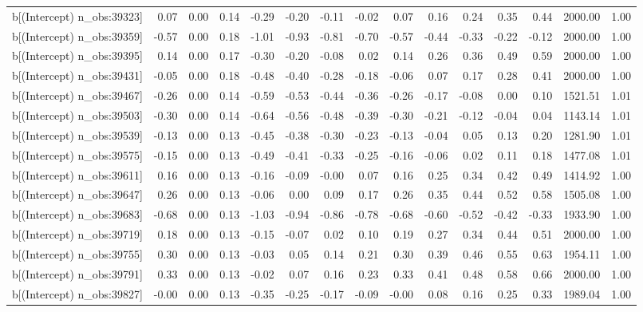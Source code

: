\begin{table}[ht]
\begin{tabular}{rrrrrrrrrrrrrrr}
  b[(Intercept) n\_obs:39323] & 0.07 & 0.00 & 0.14 & -0.29 & -0.20 & -0.11 & -0.02 & 0.07 & 0.16 & 0.24 & 0.35 & 0.44 & 2000.00 & 1.00 \\ 
  b[(Intercept) n\_obs:39359] & -0.57 & 0.00 & 0.18 & -1.01 & -0.93 & -0.81 & -0.70 & -0.57 & -0.44 & -0.33 & -0.22 & -0.12 & 2000.00 & 1.00 \\ 
  b[(Intercept) n\_obs:39395] & 0.14 & 0.00 & 0.17 & -0.30 & -0.20 & -0.08 & 0.02 & 0.14 & 0.26 & 0.36 & 0.49 & 0.59 & 2000.00 & 1.00 \\ 
  b[(Intercept) n\_obs:39431] & -0.05 & 0.00 & 0.18 & -0.48 & -0.40 & -0.28 & -0.18 & -0.06 & 0.07 & 0.17 & 0.28 & 0.41 & 2000.00 & 1.00 \\ 
  b[(Intercept) n\_obs:39467] & -0.26 & 0.00 & 0.14 & -0.59 & -0.53 & -0.44 & -0.36 & -0.26 & -0.17 & -0.08 & 0.00 & 0.10 & 1521.51 & 1.01 \\ 
  b[(Intercept) n\_obs:39503] & -0.30 & 0.00 & 0.14 & -0.64 & -0.56 & -0.48 & -0.39 & -0.30 & -0.21 & -0.12 & -0.04 & 0.04 & 1143.14 & 1.01 \\ 
  b[(Intercept) n\_obs:39539] & -0.13 & 0.00 & 0.13 & -0.45 & -0.38 & -0.30 & -0.23 & -0.13 & -0.04 & 0.05 & 0.13 & 0.20 & 1281.90 & 1.01 \\ 
  b[(Intercept) n\_obs:39575] & -0.15 & 0.00 & 0.13 & -0.49 & -0.41 & -0.33 & -0.25 & -0.16 & -0.06 & 0.02 & 0.11 & 0.18 & 1477.08 & 1.01 \\ 
  b[(Intercept) n\_obs:39611] & 0.16 & 0.00 & 0.13 & -0.16 & -0.09 & -0.00 & 0.07 & 0.16 & 0.25 & 0.34 & 0.42 & 0.49 & 1414.92 & 1.00 \\ 
  b[(Intercept) n\_obs:39647] & 0.26 & 0.00 & 0.13 & -0.06 & 0.00 & 0.09 & 0.17 & 0.26 & 0.35 & 0.44 & 0.52 & 0.58 & 1505.08 & 1.00 \\ 
  b[(Intercept) n\_obs:39683] & -0.68 & 0.00 & 0.13 & -1.03 & -0.94 & -0.86 & -0.78 & -0.68 & -0.60 & -0.52 & -0.42 & -0.33 & 1933.90 & 1.00 \\ 
  b[(Intercept) n\_obs:39719] & 0.18 & 0.00 & 0.13 & -0.15 & -0.07 & 0.02 & 0.10 & 0.19 & 0.27 & 0.34 & 0.44 & 0.51 & 2000.00 & 1.00 \\ 
  b[(Intercept) n\_obs:39755] & 0.30 & 0.00 & 0.13 & -0.03 & 0.05 & 0.14 & 0.21 & 0.30 & 0.39 & 0.46 & 0.55 & 0.63 & 1954.11 & 1.00 \\ 
  b[(Intercept) n\_obs:39791] & 0.33 & 0.00 & 0.13 & -0.02 & 0.07 & 0.16 & 0.23 & 0.33 & 0.41 & 0.48 & 0.58 & 0.66 & 2000.00 & 1.00 \\ 
  b[(Intercept) n\_obs:39827] & -0.00 & 0.00 & 0.13 & -0.35 & -0.25 & -0.17 & -0.09 & -0.00 & 0.08 & 0.16 & 0.25 & 0.33 & 1989.04 & 1.00 \\ 

\end{tabular}
\end{table}
